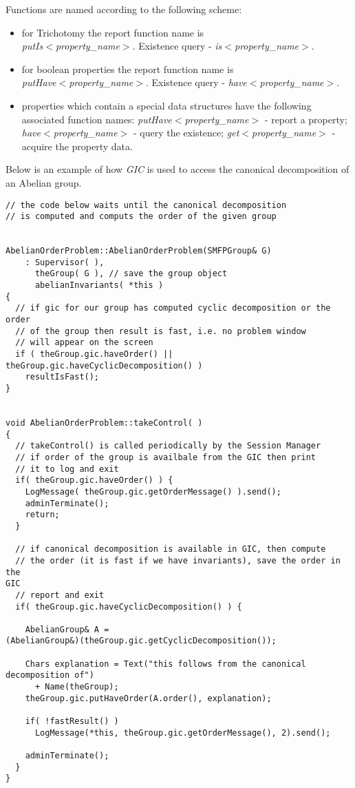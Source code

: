 \documentclass[12pt]{article}
\begin{document}
Functions are named according to the following scheme:
\begin{itemize}
\item for Trichotomy the report function name is\\
{\em putIs$<$property\_name$>$}.
Existence query - {\em is$<$property\_name$>$}.
\item for boolean properties the report function name is\\
{\em putHave$<$property\_name$>$}.
Existence query - 
{\em have$<$property\_name$>$}.
\item properties which contain a special data structures have the
following associated function names:
{\em putHave$<$property\_name$>$} - report a
property; {\em have$<$property\_name$>$} - 
query the existence; {\em get$<$property\_name$>$} - acquire the property
data.
\end{itemize}


Below  is an example of how  {\em GIC} is used to access the canonical
decomposition of an Abelian group.
\footnotesize	
\begin{verbatim}
// the code below waits until the canonical decomposition
// is computed and computs the order of the given group


AbelianOrderProblem::AbelianOrderProblem(SMFPGroup& G)
    : Supervisor( ),
      theGroup( G ), // save the group object
      abelianInvariants( *this )
{
  // if gic for our group has computed cyclic decomposition or the order
  // of the group then result is fast, i.e. no problem window
  // will appear on the screen 
  if ( theGroup.gic.haveOrder() ||
theGroup.gic.haveCyclicDecomposition() )
    resultIsFast();
}


void AbelianOrderProblem::takeControl( )
{
  // takeControl() is called periodically by the Session Manager
  // if order of the group is availbale from the GIC then print 
  // it to log and exit
  if( theGroup.gic.haveOrder() ) {
    LogMessage( theGroup.gic.getOrderMessage() ).send();
    adminTerminate();
    return;
  }

  // if canonical decomposition is available in GIC, then compute
  // the order (it is fast if we have invariants), save the order in the
GIC
  // report and exit 
  if( theGroup.gic.haveCyclicDecomposition() ) {

    AbelianGroup& A =
(AbelianGroup&)(theGroup.gic.getCyclicDecomposition());

    Chars explanation = Text("this follows from the canonical
decomposition of")
      + Name(theGroup);
    theGroup.gic.putHaveOrder(A.order(), explanation);
    
    if( !fastResult() )
      LogMessage(*this, theGroup.gic.getOrderMessage(), 2).send();
    
    adminTerminate();
  }
}

\end{verbatim}
\normalsize
\end{document}
